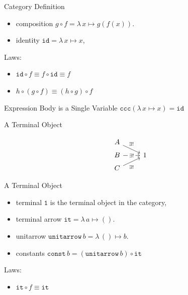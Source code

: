 \documentclass[10pt]{beamer}
\newcommand{\id}{\mathtt{id}}
\newcommand{\termin}{\mathtt{1}}
\newcommand{\termarr}{\mathtt{it}}
\newcommand{\unitarrow}{\ensuremath{\mathtt{unitarrow}}}
\newcommand{\lamf}[2]{\ensuremath{\lambda\, #1 \mapsto #2}}
\newcommand{\ccc}{\ensuremath{\mathtt{ccc}}}
\newcommand{\lamtoccc}[1]{\ensuremath{\ccc (#1)}}
\newcommand{\const}{\ensuremath{\mathtt{const}}}
\theoremstyle{definition}
\theoremstyle{remark}
\numberwithin{equation}{section}
\begin{document}
\begin{frame}[fragile]{Category Definition}
  \begin{itemize}
  \item composition $g \circ f = \lamf{x}{g(f(x))}$.
  \item identity $\id = \lamf{x}{x} $,
  \end{itemize}
  
  Laws:\\
  \begin{itemize}
  \item $\id \circ f \equiv f \circ \id \equiv f$
  \item $h \circ (g \circ f) \equiv (h \circ g) \circ f$
  \end{itemize}
\end{frame}

\begin{frame}[fragile]{Expression Body is a Single Variable}
  $\lamtoccc{\lamf{x}{x}} = \id$
\end{frame}

\begin{frame}[fragile]{A Terminal Object}
  \begin{center}
    \[
    \begin{tikzcd}[row sep=tiny]
      A \arrow[near start]{dr}{\exists!} & \\
      B \arrow["\exists!" description]{r} & 1\\
      C \arrow[swap,near start]{ur}{\exists!} & 
    \end{tikzcd}
    \]
  \end{center}
\end{frame}

\begin{frame}[fragile]{A Terminal Object}
  \begin{itemize}
  \item terminal $\termin$ is the terminal object in the category,
  \item terminal arrow $\termarr = \lamf{a}{()}$.
  \item unitarrow $\unitarrow\, b = \lamf{()}{b}$.
  \item constants $\const\, b = (\unitarrow\, b) \circ \termarr$
  \end{itemize}
  
  Laws:\\
  \begin{itemize}
  \item $\termarr \circ f \equiv \termarr$
  \end{itemize}
\end{frame}
\end{document}
